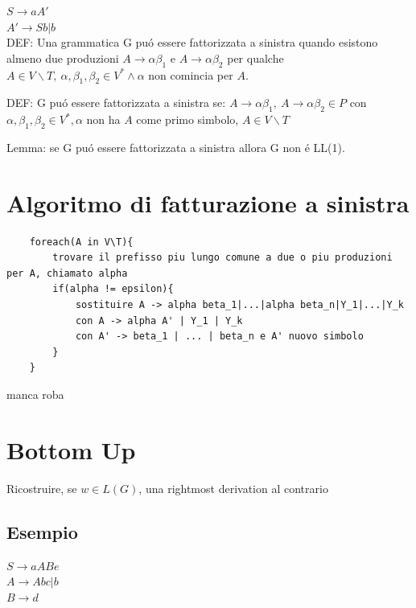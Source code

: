 $S \rightarrow aA'$\\
$A' \rightarrow Sb|b$\\

DEF: Una grammatica G pu\'o essere fattorizzata a sinistra quando esistono almeno due produzioni $A \rightarrow \alpha\beta _1$ e
$A \rightarrow \alpha\beta _2$ per qualche $A \in V\backslash T,\ \alpha ,\beta _1, \beta _2 \in V^* \land \alpha $ non comincia per $A$.

DEF: G pu\'o essere fattorizzata a sinistra se:
$A \rightarrow \alpha \beta _1,\ A \rightarrow \alpha\beta _2 \in P$ con \\
$\alpha , \beta _1, \beta _2 \in V^*, \alpha $ non ha $A$ come primo simbolo, $A \in V\backslash T$

Lemma: se G pu\'o essere fattorizzata a sinistra allora G non \'e LL(1).

\section{Algoritmo di fatturazione a sinistra}
\begin{lstlisting}
    foreach(A in V\T){
        trovare il prefisso piu lungo comune a due o piu produzioni per A, chiamato alpha 
        if(alpha != epsilon){
            sostituire A -> alpha beta_1|...|alpha beta_n|Y_1|...|Y_k
            con A -> alpha A' | Y_1 | Y_k 
            con A' -> beta_1 | ... | beta_n e A' nuovo simbolo
        }
    }
\end{lstlisting}

manca roba

\section{Bottom Up}
Ricostruire, se $w \in L(G)$, una rightmost derivation al contrario

\subsection{Esempio}
$S \rightarrow aABe$\\
$A \rightarrow Abc|b$\\
$B \rightarrow d$\\

